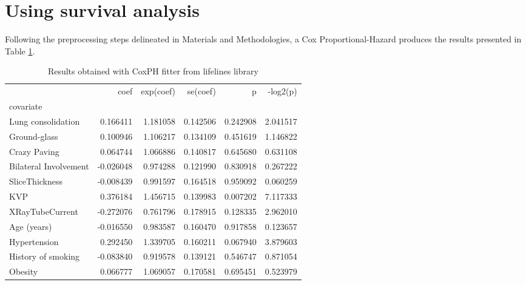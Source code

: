\section{Using survival analysis}
Following the preprocessing steps delineated in Materials and Methodologies,  a Cox Proportional-Hazard produces the results presented in Table \ref{tab:CoxResult}.

\begin{table}
\centering
\caption{Results obtained with CoxPH fitter from lifelines library\label{tab:CoxResult}}
\begin{adjustbox}{width=\linewidth}
\begin{tabular}{|lrrrrr|}
\toprule
{} &      coef &  exp(coef) &  se(coef) &           p &  -log2(p) \\
covariate                               &           &            &           &                 &               \\
\midrule
Lung consolidation                     			&  0.166411 &   1.181058 &  0.142506 &        0.242908 &  2.041517 \\
Ground-glass                            			&  0.100946 &   1.106217 &  0.134109 &        0.451619 &  1.146822 \\
Crazy Paving                             			&  0.064744 &   1.066886 &  0.140817 &        0.645680 &  0.631108 \\
Bilateral Involvement                  			& -0.026048 &   0.974288 &  0.121990 &        0.830918 &  0.267222 \\
SliceThickness                          			& -0.008439 &   0.991597 &  0.164518 &        0.959092 &  0.060259 \\
KVP                                        			&  0.376184 &   1.456715 &  0.139983 &        0.007202 &  7.117333 \\
XRayTubeCurrent                     			& -0.272076 &   0.761796 &  0.178915 &        0.128335 &  2.962010 \\
Age (years)                              			& -0.016550 &   0.983587 &  0.160470 &        0.917858 &  0.123657 \\
Hypertension                            			&  0.292450 &   1.339705 &  0.160211 &        0.067940 &  3.879603 \\
History of smoking                    			& -0.083840 &   0.919578 &  0.139121 &         0.546747 &  0.871054 \\
Obesity                                    			&  0.066777 &   1.069057 &  0.170581 &         0.695451 &  0.523979 \\

\end{tabular}
\end{adjustbox}
\end{table}
